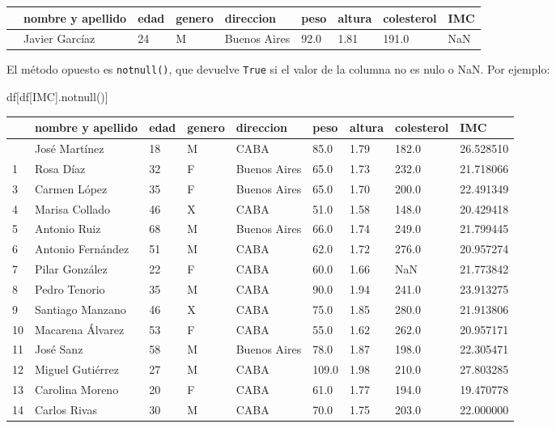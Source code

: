 \documentclass[
  letterpaper,
  DIV=11,
  numbers=noendperiod]{scrreprt}
\newenvironment{Shaded}{\begin{snugshade}}{\end{snugshade}}
\newcommand{\NormalTok}[1]{\textcolor[rgb]{0.00,0.23,0.31}{#1}}
\newcommand{\StringTok}[1]{\textcolor[rgb]{0.13,0.47,0.30}{#1}}
\begin{document}
\begin{longtable}[]{@{}lllllllll@{}}
\toprule\noalign{}
& nombre y apellido & edad & genero & direccion & peso & altura &
colesterol & IMC \\
\midrule\noalign{}
\endhead
\bottomrule\noalign{}
\endlastfoot
2 & Javier Garcíaz & 24 & M & Buenos Aires & 92.0 & 1.81 & 191.0 &
NaN \\
\end{longtable}

El método opuesto es \texttt{notnull()}, que devuelve \texttt{True} si
el valor de la columna no es nulo o NaN. Por ejemplo:

\begin{Shaded}
\begin{Highlighting}[]
\NormalTok{df[df[}\StringTok{\textquotesingle{}IMC\textquotesingle{}}\NormalTok{].notnull()]}
\end{Highlighting}
\end{Shaded}

\begin{longtable}[]{@{}lllllllll@{}}
\toprule\noalign{}
& nombre y apellido & edad & genero & direccion & peso & altura &
colesterol & IMC \\
\midrule\noalign{}
\endhead
\bottomrule\noalign{}
\endlastfoot
0 & José Martínez & 18 & M & CABA & 85.0 & 1.79 & 182.0 & 26.528510 \\
1 & Rosa Díaz & 32 & F & Buenos Aires & 65.0 & 1.73 & 232.0 &
21.718066 \\
3 & Carmen López & 35 & F & Buenos Aires & 65.0 & 1.70 & 200.0 &
22.491349 \\
4 & Marisa Collado & 46 & X & CABA & 51.0 & 1.58 & 148.0 & 20.429418 \\
5 & Antonio Ruiz & 68 & M & Buenos Aires & 66.0 & 1.74 & 249.0 &
21.799445 \\
6 & Antonio Fernández & 51 & M & CABA & 62.0 & 1.72 & 276.0 &
20.957274 \\
7 & Pilar González & 22 & F & CABA & 60.0 & 1.66 & NaN & 21.773842 \\
8 & Pedro Tenorio & 35 & M & CABA & 90.0 & 1.94 & 241.0 & 23.913275 \\
9 & Santiago Manzano & 46 & X & CABA & 75.0 & 1.85 & 280.0 &
21.913806 \\
10 & Macarena Álvarez & 53 & F & CABA & 55.0 & 1.62 & 262.0 &
20.957171 \\
11 & José Sanz & 58 & M & Buenos Aires & 78.0 & 1.87 & 198.0 &
22.305471 \\
12 & Miguel Gutiérrez & 27 & M & CABA & 109.0 & 1.98 & 210.0 &
27.803285 \\
13 & Carolina Moreno & 20 & F & CABA & 61.0 & 1.77 & 194.0 &
19.470778 \\
14 & Carlos Rivas & 30 & M & CABA & 70.0 & 1.75 & 203.0 & 22.000000 \\
\end{longtable}
\end{document}
